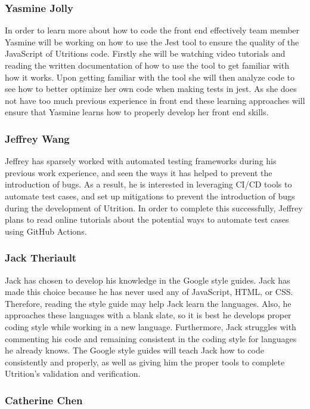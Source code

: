 \documentclass[12pt, titlepage]{article}
\begin{document}
	\subsubsection*{Yasmine Jolly}
	In order to learn more about how to code the front end effectively team member Yasmine will be working on how to use the Jest tool to ensure the quality of the JavaScript of Utritions code. Firstly she will be watching  video tutorials and reading the written documentation of how to use the tool to get familiar with how it works. Upon getting familiar with the tool she will then analyze code to see how to better optimize her own code when making tests in jest. As she does not have too much previous experience in front end these learning approaches will ensure that Yasmine learns how to properly develop her front end skills.
	
	\subsubsection*{Jeffrey Wang}
	
	Jeffrey has sparsely worked with automated testing frameworks during his 
	previous work experience, and seen the ways it has helped to prevent the 
	introduction of bugs. As a result, he is interested in leveraging CI/CD 
	tools to automate test cases, and set up mitigations to prevent the 
	introduction of bugs during the development of Utrition. In order to 
	complete this successfully, Jeffrey plans to read online tutorials about 
	the potential ways to automate test cases using GitHub Actions.
	
	\subsubsection*{Jack Theriault}
	Jack has chosen to develop his knowledge in the Google style guides. Jack has made this choice because he has never used any of JavaScript, HTML, or CSS. Therefore, reading the style guide may help Jack learn the languages. Also, he approaches these languages with a blank slate, so it is best he develops proper coding style  while working in a new language. Furthermore, Jack struggles with commenting his code and remaining consistent in the coding style for languages he already knows. The Google style guides will teach Jack how to code consistently and properly, as well as giving him the proper tools to complete Utrition's validation and verification.
	
	\subsubsection*{Catherine Chen}
	
\end{document}
